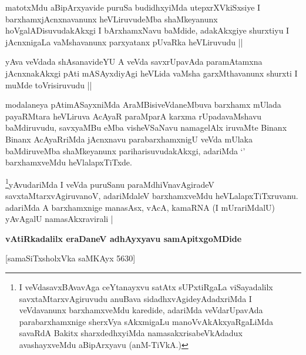 \begin{artha}
matotxMdu aBipArxyavide puruSa budidhxyiMda utepxrXVkiSxsiye I
barxhamxjAcnxnavanunx heVLiruvudeMba shaMkeyanunx
hoVgalADisuvudakAkxgi I bArxhamxNavu baMdide, adakAkxgiye shurxtiyu I
jAcnxnigaLa vaMshavanunx parxyatanx pUvaRka heVLiruvudu ||
\end{artha}


\begin{artha}
yAva veVdada shAsanavideYU A veVda savxrUpavAda paramAtamxna
jAcnxnakAkxgi pAti mASAyxdiyAgi heVLida vaMsha garxMthavanunx shurxti
I muMde toVrisiruvudu ||
\end{artha}

\begin{artha}
modalaneya pAtimASayxniMda AraMBisiveVdaneMbuva barxhamx mUlada
payaRMtara heVLiruva AcAyaR paraMparA karxma rUpadavaMshavu
baMdiruvudu, savxyaMBu eMba visheVSaNavu namagelAlx iruvaMte Binanx
Binanx AcAyaRriMda jAcnxnavu parabarxhamxnigU veVda mUlaka
baMdiruveMba shaMkeyanunx pariharisuvudakAkxgi, adariMda `\stext'
barxhamxveMdu heVlalapxTiTxde.
\end{artha}

\begin{artha}
\footnote[1]{I veVdasavxBAvavAga ceYtanayxvu satAtx sUPxtiRgaLa
  viSayadalilx savxtaMtarxvAgiruvudu anuBava sidadhxvAgideyAdadxriMda
  I veVdavanunx barxhamxveMdu karedide, adariMda veVdarUpavAda
  parabarxhamxnige sherxVya sAkxmigaLu manoVvAkAkxyaRgaLiMda savaRdA
  Bakitx sharxdedhxyiMda namasakxrisabeVkAdadux avashayxveMdu
  aBipArxyavu (anM-TiVkA.)}yAvudariMda I veVda puruSanu paraMdhiVnavAgiradeV
savxtaMtarxvAgiruvanoV, adariMdaleV barxhamxveMdu
heVLalapxTiTxruvanu. adariMda A barxhamxnige manasAsx, vAcA, kamaRNA
(I mUrariMdalU) yAvAgalU namasAkxravirali |
\end{artha}

\begin{center}
\textbf{vAtiRkadalilx eraDaneV adhAyxyavu samApitxgoMDide }

\medskip

 [samaSiTxsholxVka saMKAyx 5630]
\end{center}
